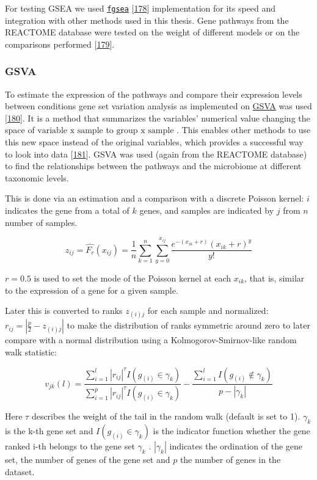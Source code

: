 \documentclass[
  12pt,
  a4paper,
  twoside,
  openright]{book}
\begin{document}
For testing GSEA we used \href{https://bioconductor.org/packages/fgsea}{\texttt{fgsea}} {[}\protect\hyperlink{ref-korotkevich2021}{178}{]} implementation for its speed and integration with other methods used in this thesis.
Gene pathways from the REACTOME database were tested on the weight of different models or on the comparisons performed {[}\protect\hyperlink{ref-fabregat2016}{179}{]}.

\hypertarget{gsva}{%
\subsubsection{GSVA}\label{gsva}}

To estimate the expression of the pathways and compare their expression levels between conditions gene set variation analysis as implemented on \href{https://bioconductor.org/packages/GSVA}{GSVA} was used {[}\protect\hyperlink{ref-huxe4nzelmann2013}{180}{]}.
It is a method that summarizes the variables' numerical value changing the space of \(\text{variable x sample}\) to \(\text{group x sample}\) .
This enables other methods to use this new space instead of the original variables, which provides a successful way to look into data {[}\protect\hyperlink{ref-escudero-hernuxe1ndez2021}{181}{]}.
GSVA was used (again from the REACTOME database) to find the relationships between the pathways and the microbiome at different taxonomic levels.

This is done via an estimation and a comparison with a discrete Poisson kernel: \(i\) indicates the gene from a total of \(k\) genes, and samples are indicated by \(j\) from \(n\) number of samples.

\[
z_{ij}=\hat{F_r}(x_{ij}) = \frac{1}{n}\sum_{k=1}^n\sum_{y=0}^{x_{ij}}\dfrac{e^{-(x_{ik}+r)}(x_{ik} + r)^y }{y!}
\]

\(r = 0.5\) is used to set the mode of the Poisson kernel at each \(x_{ik}\), that is, similar to the expression of a gene for a given sample.

Later this is converted to ranks \(z_{(i)j}\) for each sample and normalized: \(r_{ij}=|\frac{p}{2}-z_{(i)j}|\) to make the distribution of ranks symmetric around zero to later compare with a normal distribution using a Kolmogorov-Smirnov-like random walk statistic:

\[
v_{jk}(l)=\dfrac{\sum_{i=1}^l|r_{ij}|^{\tau}I(g_{(i)}\in \gamma_k)}{\sum_{i=1}^p|r_{ij}|^{\tau}I(g_{(i)} \in \gamma_k)}
- \dfrac{\sum_{i=1}^lI(g_{(i)} \not \in\gamma_k)}{p-|\gamma_k|}
\]

Here \(\tau\) describes the weight of the tail in the random walk (default is set to 1).
\(\gamma_k\) is the k-th gene set and \(I(g_{(i)}\in \gamma_k)\) is the indicator function whether the gene ranked i-th belongs to the gene set \(\gamma_k\) .
\(|\gamma_k|\) indicates the ordination of the gene set, the number of genes of the gene set and \(p\) the number of genes in the dataset.
\end{document}
